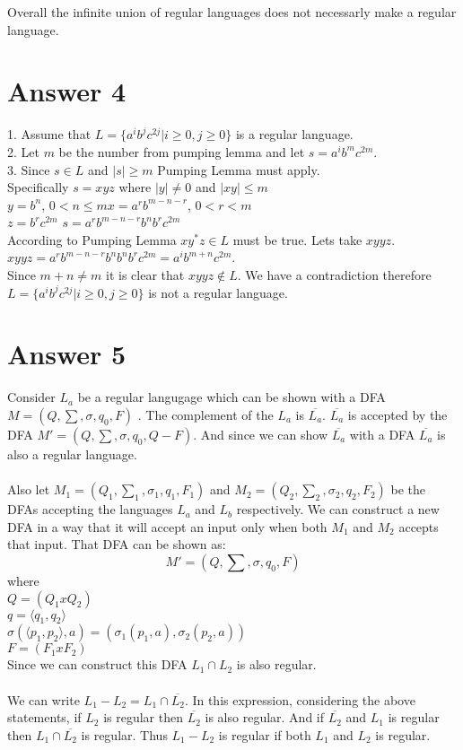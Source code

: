 \documentclass[12pt]{article}
\begin{document}
Overall the infinite union of regular languages does not necessarly make a regular language.
\section*{Answer 4}

1. Assume that $L=\lbrace a^ib^jc^{2j}|i\geq 0,j\geq 0\rbrace$ is a regular language.\\
2. Let $m$ be the number from pumping lemma and let $s=a^ib^mc^{2m}$.\\
3. Since $s\in L$ and $|s|\geq m$ Pumping Lemma must apply.\\
Specifically $s=xyz$ where $|y|\neq 0$ and $|xy|\leq m$\\
$y=b^n$, $0<n\leq m$\hspace{0.7cm}$x=a^rb^{m-n-r}$, $0<r<m$ \\$z=b^{r}c^{2m}$ \hspace{2cm} $s=a^rb^{m-n-r}b^nb^{r}c^{2m}$\\
According to Pumping Lemma $xy^*z \in L$ must be true. Lets take $xyyz$.\\
$xyyz=a^rb^{m-n-r}b^nb^nb^{r}c^{2m} = a^ib^{m+n}c^{2m}$.\\
Since $m+n\neq m$ it is clear that $xyyz\notin L$. We have a contradiction therefore $L=\lbrace a^ib^jc^{2j}|i\geq 0,j\geq 0\rbrace$ is not a regular language.

\section*{Answer 5}
Consider $L_{a}$ be a regular langugage which can be shown with a DFA $M =(Q,\sum ,\sigma ,q_0 ,F )$ . The complement of the $L_{a}$ is $\overline{L_a}$. 
$\overline{L_a}$ is accepted by the DFA $M' =(Q,\sum ,\sigma ,q_0 ,Q-F )$. And since we can show $\overline{L_a}$ with a DFA $\overline{L_a}$ is also a regular language.\\
\\
Also let $M_1=(Q_1,\sum_1 , \sigma_1 ,q_1,F_1)$ and $M_2=(Q_2,\sum_2 , \sigma_2 ,q_2,F_2)$ be the DFAs accepting the languages $L_a$ and $L_b$ respectively. We can construct
a new DFA in a way that it will accept an input only when both $M_1$ and $M_2$ accepts that input. That DFA can be shown as:
$$M'=(Q,\sum ,\sigma , q_0, F)$$ 
where\\
$Q=(Q_1 x Q_2)$ \\
$q=\langle q_1,q_2 \rangle$\\
$\sigma (\langle p_1,p_2 \rangle ,a)=(\sigma_1 (p_1,a), \sigma_2 (p_2,a))$\\
$F=(F_1 x F_2)$\\
Since we can construct this DFA $L_1 \cap L_2$ is also regular.\\
\\
We can write $L_1-L_2 = L_1 \cap \overline{L_2}$. In this expression, considering the above statements, if $L_2$ is regular then $\overline{L_2}$ is also regular.
And if $\overline{L_2}$ and $L_1$ is regular then $L_1 \cap \overline{L_2}$ is regular. Thus $L_1 - L_2$ is regular if both $L_1$ and $L_2$ is regular.
\end{document}
